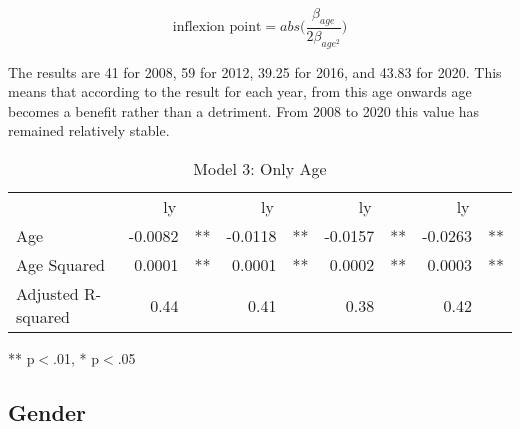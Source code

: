 \documentclass[12pt]{article}
\begin{document}
\begin{spacing}{1.5}
\begin{equation}
	\mbox{inflexion point} = abs \bigg(\frac{{\beta}_{age}}{2 {\beta}_{age^2}} \bigg)
\end{equation}

The results are 41 for 2008, 59 for 2012, 39.25 for 2016, and 43.83 for 2020. This means that according to the result for each year, from this age onwards age becomes a benefit rather than a detriment. From 2008 to 2020 this value has remained relatively stable.

\begin{table}[!h]
\caption{Model 3: Only Age}
\centering
\begin{tabular}{lllllllll}
\cline{1-9}
\multicolumn{1}{r}{} &
  \multicolumn{2}{c}{ly} &
  \multicolumn{2}{c}{ly} &
  \multicolumn{2}{c}{ly} &
  \multicolumn{2}{c}{ly} \\
\cline{1-9}
\multicolumn{1}{l}{Age} &
  \multicolumn{1}{r}{-0.0082} &
  \multicolumn{1}{l}{**} &
  \multicolumn{1}{r}{-0.0118} &
  \multicolumn{1}{l}{**} &
  \multicolumn{1}{r}{-0.0157} &
  \multicolumn{1}{l}{**} &
  \multicolumn{1}{r}{-0.0263} &
  \multicolumn{1}{l}{**} \\
\multicolumn{1}{l}{Age Squared} &
  \multicolumn{1}{r}{0.0001} &
  \multicolumn{1}{l}{**} &
  \multicolumn{1}{r}{0.0001} &
  \multicolumn{1}{l}{**} &
  \multicolumn{1}{r}{0.0002} &
  \multicolumn{1}{l}{**} &
  \multicolumn{1}{r}{0.0003} &
  \multicolumn{1}{l}{**} \\
\multicolumn{1}{l}{Adjusted R-squared} &
  \multicolumn{1}{r}{0.44} &
  \multicolumn{1}{l}{} &
  \multicolumn{1}{r}{0.41} &
  \multicolumn{1}{l}{} &
  \multicolumn{1}{r}{0.38} &
  \multicolumn{1}{l}{} &
  \multicolumn{1}{r}{0.42} &
  \multicolumn{1}{l}{} \\
\cline{1-9}
\end{tabular}

\footnotesize{
** p$<$.01, * p$<$.05
}
\label{table:age2}
\end{table}

\end{spacing}

\subsection{Gender}
\end{document}
